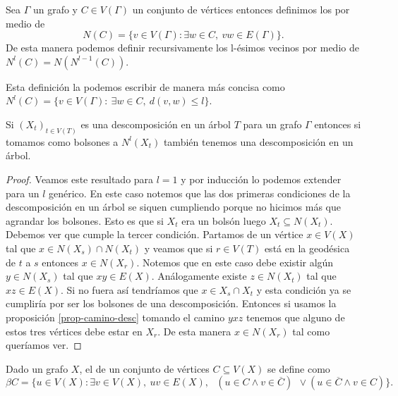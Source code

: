 \documentclass[tesis.tex]{subfiles}
\begin{document}
\begin{deff}
	Sea $\Gamma$ un grafo y $C \in V(\Gamma)$ un conjunto de vértices entonces definimos los  por medio de 
	\[
	N(C) = \{ v \in V(\Gamma) : \exists w \in C, \ vw \in E(\Gamma) \}.
	\]
	De esta manera podemos definir recursivamente los l-ésimos vecinos por medio de $N^l(C) = N(N^{l-1}(C))$.
\end{deff}

\begin{obs}
	Esta definición la podemos escribir de manera más concisa como $N^l (C) = \{ v \in V(\Gamma) : \ \exists w \in C, \  d(v,w) \le l  \}$.
\end{obs}

\begin{prop}\label{prop-vecinos-desc}
	Si $(X_t)_{t \in V(T)}$ es una descomposición en un árbol $T$ para un grafo $\Gamma$ entonces si tomamos como bolsones a $N^l(X_t)$ también tenemos una descomposición en un árbol.
\end{prop}
\begin{proof}
	
	Veamos este resultado para $l=1$ y por inducción lo podemos extender para un $l$ genérico.
	En este caso notemos que las dos primeras condiciones de la descomposición en un árbol se siquen cumpliendo porque no hicimos más que agrandar los bolsones. 
	Esto es que si $X_t$ era un bolsón luego $X_t \subseteq N(X_t)$.
	Debemos ver que cumple la tercer condición.
	Partamos de un vértice $x \in V(X)$ tal que $x \in N(X_s) \cap N(X_t)$ y veamos que si $r \in V(T)$ está en la geodésica de $t$ a $s$ entonces $x \in N(X_r)$.
	Notemos que en este caso debe existir algún $y \in N(X_s)$ tal que $xy \in E(X)$.
	Análogamente existe $z \in N(X_t)$ tal que $xz \in E(X)$.
	Si no fuera así tendríamos que $x \in X_s \cap X_t$ y esta condición ya se cumpliría por ser los bolsones de una descomposición.
	Entonces si usamos la proposición \ref{prop-camino-desc} tomando el camino $yxz$ tenemos que alguno de estos tres vértices debe estar en $X_r$.
	De esta manera $x \in N(X_r)$ tal como queríamos ver.
\end{proof}
\medskip

\begin{deff}
	Dado un grafo $X$, el  de un conjunto de vértices $C \subseteq V(X)$ se define como
	\[
	\beta C = \{ u \in V(X) : \exists v \in V(X), \ uv \in E(X), \  \ \ (u \in C \wedge v \in \overline C) \ \ \lor  (u \in \overline C \wedge v \in  C)   \}.
	\] 
\end{deff}
\end{document}

